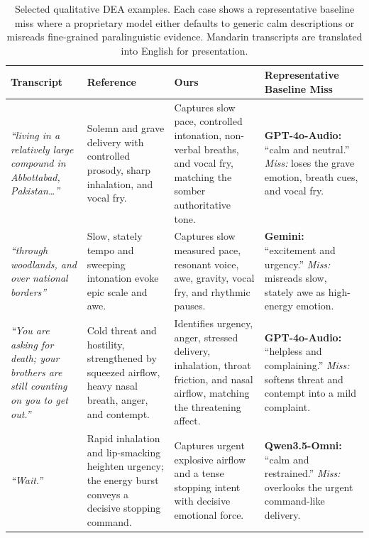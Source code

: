 \begin{table}[t]
\centering
\footnotesize
\setlength{\tabcolsep}{3pt}
\renewcommand{\arraystretch}{1.15}
\begin{tabular}{p{}p{}p{}p{}}
\toprule
\textbf{Transcript} & \textbf{Reference} & \textbf{Ours} & \textbf{Representative Baseline Miss} \\
\midrule
\emph{``living in a relatively large compound in Abbottabad, Pakistan\ldots''} &
Solemn and grave delivery with controlled prosody, sharp inhalation, and vocal fry. &
Captures slow pace, controlled intonation, non-verbal breaths, and vocal fry, matching the somber authoritative tone. &
\textbf{GPT-4o-Audio:} ``calm and neutral.'' \textit{Miss:} loses the grave emotion, breath cues, and vocal fry. \\
\midrule
\emph{``through woodlands, and over national borders''} &
Slow, stately tempo and sweeping intonation evoke epic scale and awe. &
Captures slow measured pace, resonant voice, awe, gravity, vocal fry, and rhythmic pauses. &
\textbf{Gemini:} ``excitement and urgency.'' \textit{Miss:} misreads slow, stately awe as high-energy emotion. \\
\midrule
\emph{``You are asking for death; your brothers are still counting on you to get out.''} &
Cold threat and hostility, strengthened by squeezed airflow, heavy nasal breath, anger, and contempt. &
Identifies urgency, anger, stressed delivery, inhalation, throat friction, and nasal airflow, matching the threatening affect. &
\textbf{GPT-4o-Audio:} ``helpless and complaining.'' \textit{Miss:} softens threat and contempt into a mild complaint. \\
\midrule
\emph{``Wait.''} &
Rapid inhalation and lip-smacking heighten urgency; the energy burst conveys a decisive stopping command. &
Captures urgent explosive airflow and a tense stopping intent with decisive emotional force. &
\textbf{Qwen3.5-Omni:} ``calm and restrained.'' \textit{Miss:} overlooks the urgent command-like delivery. \\
\bottomrule
\end{tabular}
\caption{Selected qualitative DEA examples. Each case shows a representative baseline miss where a proprietary model either defaults to generic calm descriptions or misreads fine-grained paralinguistic evidence. Mandarin transcripts are translated into English for presentation.}
\label{tab:dea_qualitative}
\end{table}

